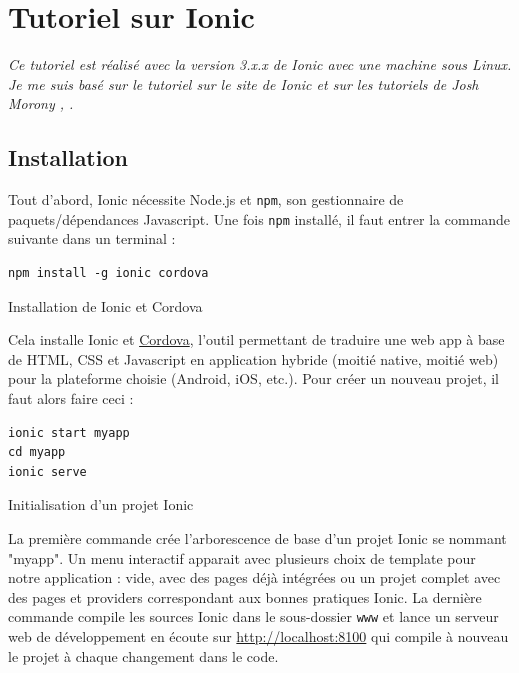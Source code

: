 \documentclass[a4paper, 12pt]{article}
\newenvironment{code}{\captionsetup{type=listing}}{}
\begin{document}
\section{Tutoriel sur Ionic}
\label{tuto_ionic}
\textit{Ce tutoriel est réalisé avec la version 3.x.x de Ionic avec une machine sous Linux. Je me suis basé sur  
le tutoriel sur le site de Ionic \cite{ref0} et sur les tutoriels de Josh Morony \cite{ref10}, \cite{ref20}.}
\subsection{Installation}
Tout d'abord, Ionic nécessite Node.js et \texttt{npm}, son gestionnaire de paquets/dépendances Javascript. 
Une fois \texttt{npm} installé, il faut entrer la commande suivante dans un terminal :
\begin{code}
    \begin{verbatim}
npm install -g ionic cordova
    \end{verbatim}
    \caption{Installation de Ionic et Cordova}
    \label{install_ionic_cordova}
\end{code}
Cela installe Ionic et \href{https://cordova.apache.org}{Cordova}, l'outil permettant de traduire une web app à base de 
HTML, CSS et Javascript en application hybride (moitié native, moitié web) pour la plateforme choisie (Android, iOS, etc.). 
Pour créer un nouveau projet, il faut alors faire ceci :
\begin{code}
    \begin{verbatim}
ionic start myapp
cd myapp
ionic serve
    \end{verbatim}
    \caption{Initialisation d'un projet Ionic}
\end{code}
La première commande crée l'arborescence de base d'un projet Ionic se nommant "myapp". Un menu interactif apparait avec 
plusieurs choix de template pour notre application : vide, avec des pages déjà intégrées ou un projet complet avec des pages 
et providers correspondant aux bonnes pratiques Ionic.
La dernière commande compile les sources Ionic dans le sous-dossier \texttt{www}
et lance un serveur web de développement en écoute sur \url{http://localhost:8100} qui compile à nouveau le projet à chaque 
changement dans le code.
\end{document}
